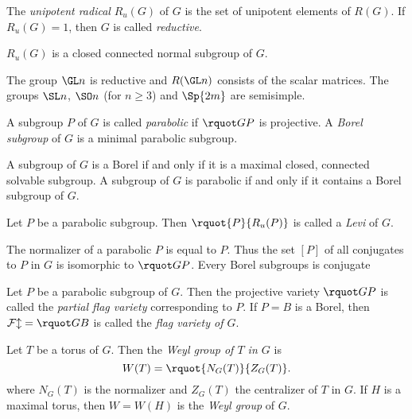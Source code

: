 \documentclass[english, no-theorem-numbers]{short-notes}
\begin{document}
\begin{Def}
    The \emph{unipotent radical} $R_u(G)$ of $G$ is the set of unipotent elements of $R(G)$.
    If $R_u(G) = 1$, then $G$ is called \emph{reductive}.
\end{Def}

$R_u(G)$ is a closed connected normal subgroup of $G$.

\begin{Ex}
    The group $\GL n$ is reductive and $R(\GL n)$ consists of the scalar matrices.
    The groups $\SL n$, $\SO n$ (for $n \ge 3$) and $\Sp{2m}$ are semisimple.
\end{Ex}

\begin{Def}
    A subgroup $P$ of $G$ is called \emph{parabolic} if $\rquot GP$ is projective.
    A \emph{Borel subgroup} of $G$ is a minimal parabolic subgroup.
\end{Def}

\begin{Prop}
    A subgroup of $G$ is a Borel if and only if it is a maximal closed, connected solvable subgroup.
    A subgroup of $G$ is parabolic if and only if it contains a Borel subgroup of $G$.
\end{Prop}

\begin{Def}
    Let $P$ be a parabolic subgroup.
    Then $\rquot{P}{R_u(P)}$ is called a \emph{Levi} of $G$.
\end{Def}

The normalizer of a parabolic $P$ is equal to $P$. 
Thus the set $[P]$ of all conjugates to $P$ in $G$ is isomorphic to $\rquot GP$.
Every Borel subgroups is conjugate

\begin{Def}
    Let $P$ be a parabolic subgroup of $G$.
    Then the projective variety $\rquot GP$ is called the \emph{partial flag variety} corresponding to $P$.
    If $P = B$ is a Borel, then $\mathcal{Fl} = \rquot GB$ is called the \emph{flag variety of $G$}.
\end{Def}

\begin{Def}
    Let $T$ be a torus of $G$. 
    Then the \emph{Weyl group of $T$ in $G$} is
    \[
        W(T) = \rquot{N_G(T)}{Z_G(T)}.
    \]
    where $N_G(T)$ is the normalizer and $Z_G(T)$ the centralizer of $T$ in $G$.
    If $H$ is a maximal torus, then $W = W(H)$ is the \emph{Weyl group} of $G$.
\end{Def}
\end{document}
